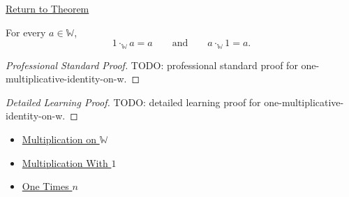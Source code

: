 \newpage
{}
\label{prf:one-multiplicative-identity-on-w}

\begin{remark*}[Return]
\hyperref[thm:one-multiplicative-identity-on-w]{Return to Theorem}
\end{remark*}

\begin{theorem*}
For every $a\in\mathbb{W}$,
\[
1\cdot_{\mathbb{W}}a=a
\qquad\text{and}\qquad
a\cdot_{\mathbb{W}}1=a.
\]
\end{theorem*}

\begin{proof}[Professional Standard Proof]
\LRAProofBodyStart
TODO: professional standard proof for one-multiplicative-identity-on-w.
\end{proof}

\begin{proof}[Detailed Learning Proof]
\LRAProofBodyStart
TODO: detailed learning proof for one-multiplicative-identity-on-w.
\end{proof}

\begin{remark*}
\end{remark*}

\begin{dependencies}
\begin{itemize}
  \item \hyperref[def:multiplication-on-w]{Multiplication on $\mathbb{W}$}
  \item \hyperref[thm:multiplication-with-one]{Multiplication With $1$}
  \item \hyperref[thm:one-times-n]{One Times $n$}
\end{itemize}
\end{dependencies}

\clearpage
